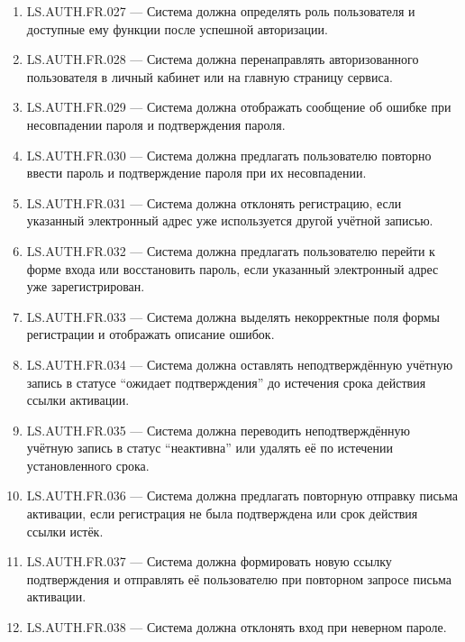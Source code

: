 \documentclass[12pt,a4paper]{article}
\begin{document}
\begin{enumerate}
		\item LS.AUTH.FR.027 --- Система должна определять роль пользователя и
		доступные ему функции после успешной авторизации.
		
		\item LS.AUTH.FR.028 --- Система должна перенаправлять авторизованного
		пользователя в личный кабинет или на главную страницу сервиса.
		
		\item LS.AUTH.FR.029 --- Система должна отображать сообщение об ошибке при
		несовпадении пароля и подтверждения пароля.
		
		\item LS.AUTH.FR.030 --- Система должна предлагать пользователю повторно
		ввести пароль и подтверждение пароля при их несовпадении.
		
		\item LS.AUTH.FR.031 --- Система должна отклонять регистрацию, если указанный
		электронный адрес уже используется другой учётной записью.
		
		\item LS.AUTH.FR.032 --- Система должна предлагать пользователю перейти к форме
		входа или восстановить пароль, если указанный электронный адрес уже
		зарегистрирован.
		
		\item LS.AUTH.FR.033 --- Система должна выделять некорректные поля формы
		регистрации и отображать описание ошибок.
		
		\item LS.AUTH.FR.034 --- Система должна оставлять неподтверждённую учётную
		запись в статусе ``ожидает подтверждения'' до истечения срока действия ссылки
		активации.
		
		\item LS.AUTH.FR.035 --- Система должна переводить неподтверждённую учётную
		запись в статус ``неактивна'' или удалять её по истечении установленного срока.
		
		\item LS.AUTH.FR.036 --- Система должна предлагать повторную отправку письма
		активации, если регистрация не была подтверждена или срок действия ссылки
		истёк.
		
		\item LS.AUTH.FR.037 --- Система должна формировать новую ссылку подтверждения
		и отправлять её пользователю при повторном запросе письма активации.
		
		\item LS.AUTH.FR.038 --- Система должна отклонять вход при неверном пароле.
		

\end{enumerate}
\end{document}
